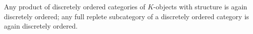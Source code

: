 Any product of discretely ordered categories of $K$-objects with structure is again discretely ordered; any full replete subcategory of a discretely ordered category is again discretely ordered.
